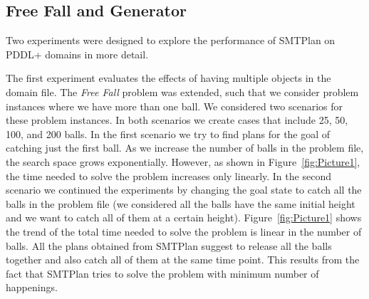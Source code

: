 \subsection{Free Fall and Generator}\label{sec:eval_objects}

Two experiments were designed to explore the performance of SMTPlan on PDDL+ domains in more detail.

The first experiment evaluates the effects of having multiple objects in the domain file. The \textit{Free Fall} problem was extended, such that we consider problem instances where we have more than one ball. We considered two scenarios for these problem instances. In both scenarios we create cases that include 25, 50, 100, and 200 balls.
In the first scenario we try to find plans for the goal of catching just the first ball. As we increase the number of balls in the problem file, the search space grows exponentially. However, as shown in Figure~\ref{fig:Picture1}, the time needed to solve the problem increases only linearly. 
In the second scenario we continued the experiments by changing the goal state to catch all the balls in the problem file (we considered all the balls have the same initial height and we want to catch all of them at a certain height). Figure~\ref{fig:Picture1} shows the trend of the total time needed to solve the problem is linear in the number of balls. All the plans obtained from SMTPlan suggest to release all the balls together and also catch all of them at the same time point. This results from the fact that SMTPlan tries to solve the problem with minimum number of happenings.

